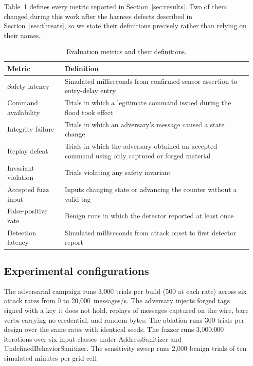 Table~\ref{tab:metrics} defines every metric reported in Section~\ref{sec:results}. Two of them
changed during this work after the harness defects described in Section~\ref{sec:threats}, so
we state their definitions precisely rather than relying on their names.

\begin{table}[htbp]
\centering\small
\caption{Evaluation metrics and their definitions.}
\label{tab:metrics}
\begin{tabular}{@{}lp{}@{}}
\toprule
Metric & Definition \\
\midrule
Safety latency & Simulated milliseconds from confirmed sensor assertion to entry-delay entry \\
Command availability & Trials in which a legitimate command issued during the flood took effect \\
Integrity failure & Trials in which an adversary's message caused a state change \\
Replay defeat & Trials in which the adversary obtained an accepted command using only captured or forged material \\
Invariant violation & Trials violating any safety invariant \\
Accepted fuzz input & Inputs changing state or advancing the counter without a valid tag \\
False-positive rate & Benign runs in which the detector reported at least once \\
Detection latency & Simulated milliseconds from attack onset to first detector report \\
\bottomrule
\end{tabular}
\end{table}

\subsection{Experimental configurations}

The adversarial campaign runs 3{,}000 trials per build (500 at each rate) across six attack rates from 0 to
20{,}000~messages/s. The adversary injects forged tags signed with a key it does not hold,
replays of messages captured on the wire, bare verbs carrying no credential, and random bytes.
The ablation runs 300 trials per design over the same rates with identical seeds. The fuzzer
runs 3{,}000{,}000 iterations over six input classes under AddressSanitizer and
UndefinedBehaviorSanitizer. The sensitivity sweep runs 2{,}000 benign trials of ten simulated
minutes per grid cell.

